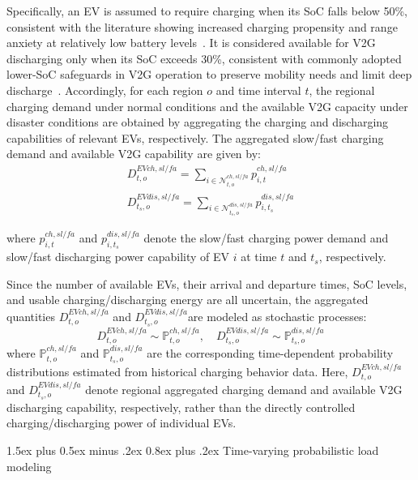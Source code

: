 \documentclass[journal]{IEEEtran}
\makeatletter
\renewcommand\subsubsection{\@startsection{subsubsection}{3}{\z@}%
  {1.5ex plus 0.5ex minus .2ex}%
  {0.8ex plus .2ex}%
  {\normalfont\normalsize\bfseries}}
\providecommand{\1}{\mathbf{1}}
\makeatother
\begin{document}
Specifically, an EV is assumed to require charging when its SoC falls below 50\%, consistent with the literature showing increased charging propensity and range anxiety at relatively low battery levels~\cite{Xu2020RangeAnxiety}. It is considered available for V2G discharging only when its SoC exceeds 30\%, consistent with commonly adopted lower-SoC safeguards in V2G operation to preserve mobility needs and limit deep discharge~\cite{Sains2018V2G}. Accordingly, for each region 
$o$ and time interval 
$t$, the regional charging demand under normal conditions and the available V2G capacity under disaster conditions are obtained by aggregating the charging and discharging capabilities of relevant EVs, respectively. The aggregated slow/fast charging demand and available V2G capability are given by:
\begin{equation}
\begin{aligned}
D_{t,o}^{EVch,sl/fa}=\sum_{i\in \mathcal{N}_{t,o}^{ch,sl/fa}} p_{i,t}^{ch,sl/fa}
\\
D_{t_s,o}^{EVdis,sl/fa}=\sum_{i\in \mathcal{N}_{t_s,o}^{dis,sl/fa}} p_{i,t_s}^{dis,sl/fa}
\end{aligned}
\end{equation}

where $p_{i,t}^{ch,sl/fa}$ and $p_{i,t_s}^{dis,sl/fa}$ denote the slow/fast charging power demand and slow/fast discharging power capability of EV $i$ at time $t$ and $t_s$, respectively.

Since the number of available EVs, their arrival and departure times, SoC levels, and usable charging/discharging energy are all uncertain, the aggregated quantities $D_{t,o}^{EVch,sl/fa}$ and $D_{t_s,o}^{EVdis,sl/fa}$are modeled as stochastic processes:
\begin{equation}
D_{t,o}^{EVch,sl/fa} \sim \mathbb{P}_{t,o}^{ch,sl/fa},
\quad
D_{t_s,o}^{EVdis,sl/fa} \sim \mathbb{P}_{t_s,o}^{dis,sl/fa}
\end{equation}
where $\mathbb{P}_{t,o}^{ch,sl/fa}$ and $\mathbb{P}_{t_s,o}^{dis,sl/fa}$ are the corresponding time-dependent probability distributions estimated from historical charging behavior data. Here, $D_{t,o}^{EVch,sl/fa}$ and $D_{t_s,o}^{EVdis,sl/fa}$ denote regional aggregated charging demand and available V2G discharging capability, respectively, rather than the directly controlled charging/discharging power of individual EVs.




\subsubsection{Time-varying probabilistic load modeling}
\end{document}

